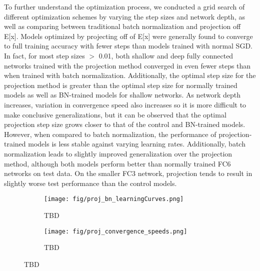 
To further understand the optimization process, we conducted a grid search of different optimization schemes by varying the step sizes and network depth, as well as comparing between traditional batch normalization and projection off E[x]. Models optimized by projecting off of E[x] were generally found to converge to full training accuracy with fewer steps than models trained with normal SGD. In fact, for most step sizes $>$ 0.01, both shallow and deep fully connected networks trained with the projection method converged in even fewer steps than when trained with batch normalization. Additionally, the optimal step size for the projection method is greater than the optimal step size for normally trained models as well as BN-trained models for shallow networks. As network depth increases, variation in convergence speed also increases so it is more difficult to make conclusive generalizations, but it can be observed that the optimal projection step size grows closer to that of the control and BN-trained models. However, when compared to batch normalization, the performance of projection-trained models is less stable against varying learning rates. Additionally, batch normalization leads to slightly improved generalization over the projection method, although both models perform better than normally trained FC6 networks on test data. On the smaller FC3 network, projection tends to result in slightly worse test performance than the control models.

\begin{figure}[th]
    \centering
    \begin{subfigure}[b]{0.49\textwidth}
        \centering
        \captionsetup{justification=centering}
        \texttt{[image: fig/proj\_bn\_learningCurves.png]}
        \caption{TBD}
        \label{fig:overlap_approx}
    \end{subfigure}
    \hfill
    \begin{subfigure}[b]{0.49\textwidth}
        \centering
        \captionsetup{justification=centering}
        \texttt{[image: fig/proj\_convergence\_speeds.png]}
        \caption{TBD}
        \label{fig:eigenval_approx}
    \end{subfigure}
    \caption{TBD}
    \label{fig:three graphs}
\end{figure}

